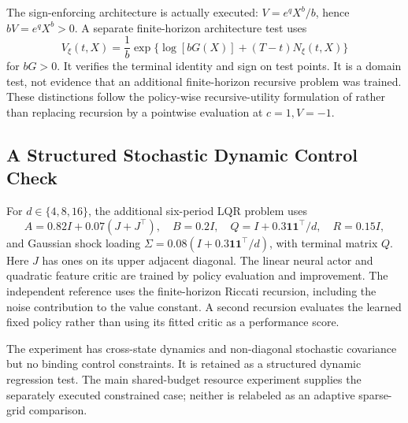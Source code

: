 The sign-enforcing architecture is actually executed: $V=e^qX^b/b$, hence $bV=e^qX^b>0$. A separate finite-horizon architecture test uses
\[
 V_\xi(t,X)=\frac1b\exp\{\log[bG(X)]+(T-t)N_\xi(t,X)\}
\]
for $bG>0$. It verifies the terminal identity and sign on test points. It is a domain test, not evidence that an additional finite-horizon recursive problem was trained. These distinctions follow the policy-wise recursive-utility formulation of \citet{duffie1992} rather than replacing recursion by a pointwise evaluation at $c=1,V=-1$.

\subsection{A Structured Stochastic Dynamic Control Check}
For $d\in\{4,8,16\}$, the additional six-period LQR problem uses
\[
 A=0.82I+0.07(J+J^\top),\quad B=0.2I,\quad
 Q=I+0.3\mathbf1\mathbf1^\top/d,\quad R=0.15I,
\]
and Gaussian shock loading $\Sigma=0.08(I+0.3\mathbf1\mathbf1^\top/d)$, with terminal matrix $Q$. Here $J$ has ones on its upper adjacent diagonal. The linear neural actor and quadratic feature critic are trained by policy evaluation and improvement. The independent reference uses the finite-horizon Riccati recursion, including the noise contribution to the value constant. A second recursion evaluates the learned fixed policy rather than using its fitted critic as a performance score.



The experiment has cross-state dynamics and non-diagonal stochastic covariance but no binding control constraints. It is retained as a structured dynamic regression test. The main shared-budget resource experiment supplies the separately executed constrained case; neither is relabeled as an adaptive sparse-grid comparison.
